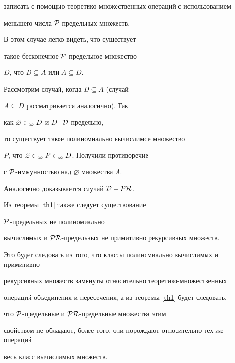 \begin{pf}
записать с помощью теоретико-множественных операций с использованием


меньшего числа $\cal{P}$-предельных множеств.


В этом случае легко видеть, что существует


такое бесконечное $\cal{P}$-предельное множество


$D$, что $D\subseteq A$ или $A\subseteq D$.





Рассмотрим случай, когда $D\subseteq A$ (случай


$A\subseteq D$ рассматривается аналогично). Так


как ${\varnothing}\subset_\infty{D}$ и $D$ \ $\cal{D}$-предельно,


то существует такое полиномиально вычислимое множество


$P$, что ${\varnothing}\subset_\infty{{P}\subset_\infty{D}}$. Получили противоречие


с $\cal{P}$-иммунностью над $\varnothing$ множества $A$.





Аналогично доказывается случай $\cal{D}=\cal{PR}$.


\end{pf}





\begin{notenonum}


Из теоремы \ref{th1} также следует существование


$\cal{P}$-предельных не полиномиально


вычислимых и $\cal{PR}$-предельных не примитивно рекурсивных множеств.


Это будет следовать из того, что классы полиномиально вычислимых и примитивно


рекурсивных множеств замкнуты относительно теоретико-множественных


операций объединения и пересечения, а из теоремы \ref{th1} будет следовать,


что $\cal{P}$-предельные и $\cal{PR}$-предельные множества этим


свойством не обладают, более того, они порождают относительно тех же операций


весь класс вычислимых множеств.


\end{notenonum}








